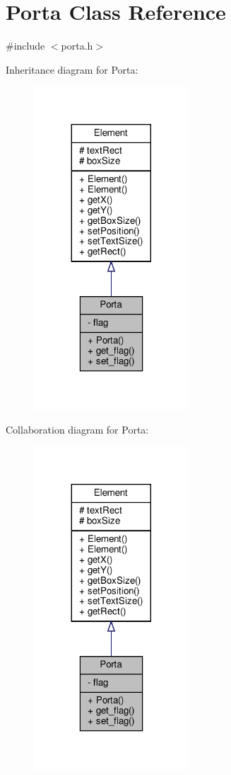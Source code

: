 \hypertarget{classPorta}{}\section{Porta Class Reference}
\label{classPorta}


{\ttfamily \#include $<$porta.\+h$>$}



Inheritance diagram for Porta\+:
\nopagebreak
\begin{figure}[H]
\begin{center}
\leavevmode
\includegraphics[width=164pt]{classPorta__inherit__graph}
\end{center}
\end{figure}


Collaboration diagram for Porta\+:
\nopagebreak
\begin{figure}[H]
\begin{center}
\leavevmode
\includegraphics[width=164pt]{classPorta__coll__graph}
\end{center}
\end{figure}

